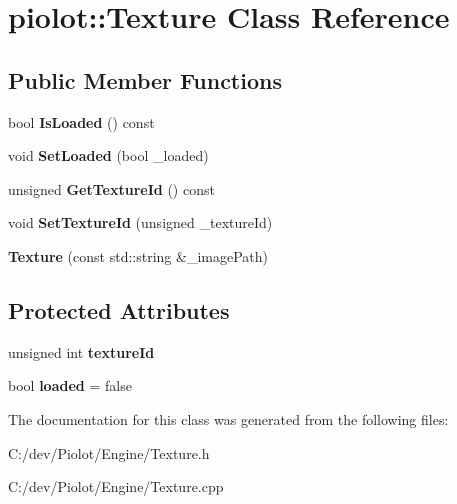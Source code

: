 \hypertarget{classpiolot_1_1_texture}{}\section{piolot\+:\+:Texture Class Reference}
\label{classpiolot_1_1_texture}
\subsection*{Public Member Functions}
\begin{DoxyCompactItemize}
\item 
\mbox{\label{classpiolot_1_1_texture_a059b9fc9103e7e04d189ec7c42b67721}} 
bool {\bfseries Is\+Loaded} () const
\item 
\mbox{\label{classpiolot_1_1_texture_aa827eaf24bde9ce9cf31954c81be6c99}} 
void {\bfseries Set\+Loaded} (bool \+\_\+loaded)
\item 
\mbox{\label{classpiolot_1_1_texture_ac169de31ffc45bb37a2702b82ec076b6}} 
unsigned {\bfseries Get\+Texture\+Id} () const
\item 
\mbox{\label{classpiolot_1_1_texture_abb6e33d45d8ba25bc09201edf280a391}} 
void {\bfseries Set\+Texture\+Id} (unsigned \+\_\+texture\+Id)
\item 
\mbox{\label{classpiolot_1_1_texture_a7980c131ee2cfee57dd92797048f95cc}} 
{\bfseries Texture} (const std\+::string \&\+\_\+image\+Path)
\end{DoxyCompactItemize}
\subsection*{Protected Attributes}
\begin{DoxyCompactItemize}
\item 
\mbox{\label{classpiolot_1_1_texture_a11b86ffd9963a4f9a98e3d70edc14322}} 
unsigned int {\bfseries texture\+Id}
\item 
\mbox{\label{classpiolot_1_1_texture_ae5c1576fdea6556a4d5a0faa0a52a9a8}} 
bool {\bfseries loaded} = false
\end{DoxyCompactItemize}


The documentation for this class was generated from the following files\+:\begin{DoxyCompactItemize}
\item 
C\+:/dev/\+Piolot/\+Engine/Texture.\+h\item 
C\+:/dev/\+Piolot/\+Engine/Texture.\+cpp\end{DoxyCompactItemize}
